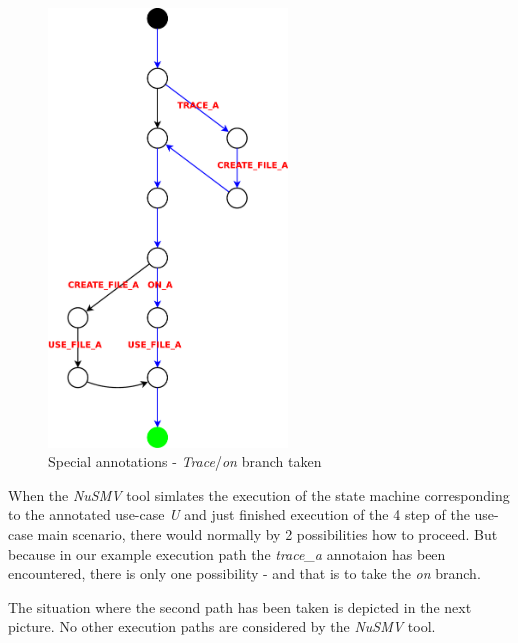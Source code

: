 \begin{figure}[ht]
  \centering
  \includegraphics[width=180pt]{images/traceTest_path_taken}
  \caption{Special annotations - \emph{Trace}/\emph{on} branch taken}
  \label{fig:traceTestTaken}
\end{figure}
When the \emph{NuSMV} tool simlates the execution of the state machine corresponding to the annotated use-case \emph{U} and just finished
execution of the 4 step of the use-case main scenario, there would normally by 2 possibilities how to proceed. But because in our
example execution path the \emph{trace\_a} annotaion has been encountered, there is only one possibility - and that is to take the
\emph{on} branch.

The situation where the second path has been taken is depicted in the next picture. No other execution paths are considered by the
\emph{NuSMV} tool.

\newpage

